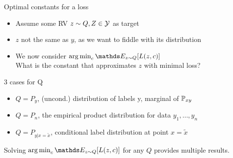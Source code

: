 \documentclass[11pt,compress,t,notes=noshow, xcolor=table]{beamer}
\begin{document}
\begin{vbframe}{Optimal constants for a loss}

\begin{itemize}
\item Assume some RV $z \sim Q, Z \in \mathcal{Y}$ as target
\item $z$ not the same as $y$, as we want to fiddle with its distribution
\item We now consider $\argmin_c \E_{z \sim Q}[L(z, c)]$\\
What is the constant that approximates $z$ with minimal loss?
\end{itemize}

\lz

3 cases for Q
\begin{itemize}
\item $Q = P_y$, (uncond.) distribution of labels y, marginal of $\mathbb{P}_{xy}$
\item $Q = P_n$, the empirical product distribution for data $y_1, \ldots, y_n$
\item $Q = P_{y | x = \tilde{x}}$, conditional label distribution at point $x = \tilde{x}$
\end{itemize}

\lz

Solving $\argmin_c \E_{z \sim Q}[L(z, c)]$ for any $Q$ provides 
multiple results.


\end{vbframe}
\end{document}
